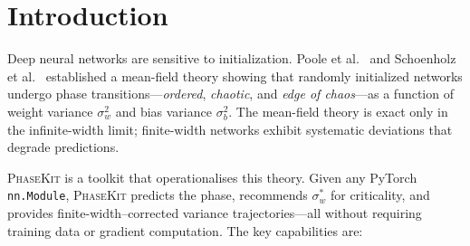 \documentclass[10pt]{article}
\newcommand{\ToolName}{\textsc{PhaseKit}}
\begin{document}
\section{Introduction}
\label{sec:intro}

Deep neural networks are sensitive to initialization.
Poole et al.~\cite{poole2016exponential} and Schoenholz et al.~\cite{schoenholz2017deep} established a mean-field theory showing that randomly initialized networks undergo phase transitions---\emph{ordered}, \emph{chaotic}, and \emph{edge of chaos}---as a function of weight variance $\sigma_w^2$ and bias variance $\sigma_b^2$.
The mean-field theory is exact only in the infinite-width limit; finite-width networks exhibit systematic deviations that degrade predictions.

\ToolName{} is a toolkit that operationalises this theory.
Given any PyTorch \texttt{nn.Module}, \ToolName{} predicts the phase, recommends $\sigma_w^*$ for criticality, and provides finite-width--corrected variance trajectories---all without requiring training data or gradient computation.
The key capabilities are:
\end{document}
